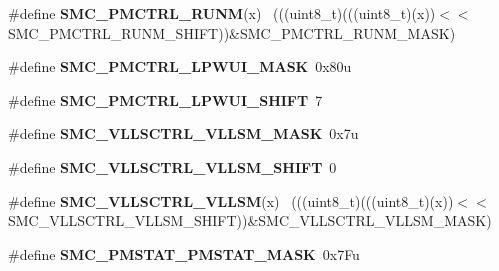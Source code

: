 \begin{DoxyCompactItemize}
\item 
\hypertarget{group___s_m_c___register___masks_gaecab837484639ef513d4c54d68eacc34}{}\#define {\bfseries S\+M\+C\+\_\+\+P\+M\+C\+T\+R\+L\+\_\+\+R\+U\+N\+M}(x)                                          ~(((uint8\+\_\+t)(((uint8\+\_\+t)(x))$<$$<$S\+M\+C\+\_\+\+P\+M\+C\+T\+R\+L\+\_\+\+R\+U\+N\+M\+\_\+\+S\+H\+I\+F\+T))\&S\+M\+C\+\_\+\+P\+M\+C\+T\+R\+L\+\_\+\+R\+U\+N\+M\+\_\+\+M\+A\+S\+K)\label{group___s_m_c___register___masks_gaecab837484639ef513d4c54d68eacc34}

\item 
\hypertarget{group___s_m_c___register___masks_ga13fe417a536c3dc080bb978a13a6364d}{}\#define {\bfseries S\+M\+C\+\_\+\+P\+M\+C\+T\+R\+L\+\_\+\+L\+P\+W\+U\+I\+\_\+\+M\+A\+S\+K}~0x80u\label{group___s_m_c___register___masks_ga13fe417a536c3dc080bb978a13a6364d}

\item 
\hypertarget{group___s_m_c___register___masks_ga923f713c8f946601de6acd8088624b20}{}\#define {\bfseries S\+M\+C\+\_\+\+P\+M\+C\+T\+R\+L\+\_\+\+L\+P\+W\+U\+I\+\_\+\+S\+H\+I\+F\+T}~7\label{group___s_m_c___register___masks_ga923f713c8f946601de6acd8088624b20}

\item 
\hypertarget{group___s_m_c___register___masks_ga4f4e91c4841316ab1eae1a74c0091ff4}{}\#define {\bfseries S\+M\+C\+\_\+\+V\+L\+L\+S\+C\+T\+R\+L\+\_\+\+V\+L\+L\+S\+M\+\_\+\+M\+A\+S\+K}~0x7u\label{group___s_m_c___register___masks_ga4f4e91c4841316ab1eae1a74c0091ff4}

\item 
\hypertarget{group___s_m_c___register___masks_ga67af6c7ed0835ed408cf511e8b9c9b13}{}\#define {\bfseries S\+M\+C\+\_\+\+V\+L\+L\+S\+C\+T\+R\+L\+\_\+\+V\+L\+L\+S\+M\+\_\+\+S\+H\+I\+F\+T}~0\label{group___s_m_c___register___masks_ga67af6c7ed0835ed408cf511e8b9c9b13}

\item 
\hypertarget{group___s_m_c___register___masks_ga344f6e0be6abf3a3a2e2e1972bd16155}{}\#define {\bfseries S\+M\+C\+\_\+\+V\+L\+L\+S\+C\+T\+R\+L\+\_\+\+V\+L\+L\+S\+M}(x)                                    ~(((uint8\+\_\+t)(((uint8\+\_\+t)(x))$<$$<$S\+M\+C\+\_\+\+V\+L\+L\+S\+C\+T\+R\+L\+\_\+\+V\+L\+L\+S\+M\+\_\+\+S\+H\+I\+F\+T))\&S\+M\+C\+\_\+\+V\+L\+L\+S\+C\+T\+R\+L\+\_\+\+V\+L\+L\+S\+M\+\_\+\+M\+A\+S\+K)\label{group___s_m_c___register___masks_ga344f6e0be6abf3a3a2e2e1972bd16155}

\item 
\hypertarget{group___s_m_c___register___masks_ga2574f973caed7a43c1d0b69888866f63}{}\#define {\bfseries S\+M\+C\+\_\+\+P\+M\+S\+T\+A\+T\+\_\+\+P\+M\+S\+T\+A\+T\+\_\+\+M\+A\+S\+K}~0x7\+Fu\label{group___s_m_c___register___masks_ga2574f973caed7a43c1d0b69888866f63}


\end{DoxyCompactItemize}
